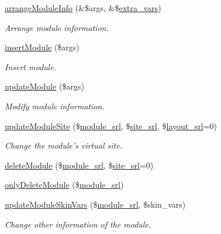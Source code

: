\begin{DoxyCompactItemize}
\hyperlink{classmoduleController_a4c5f4174ead13e475ea863184bf657d6}{arrange\+Module\+Info} (\&\$args, \&\$\hyperlink{ko_8install_8php_ae1dcb37fc34a8f312d2e6abd6f806743}{extra\+\_\+vars})
\begin{DoxyCompactList}\small\item\em Arrange module information. \end{DoxyCompactList}\item 
\hyperlink{classmoduleController_a8876924470cbfa94679d73dc6fc61332}{insert\+Module} (\$args)
\begin{DoxyCompactList}\small\item\em Insert module. \end{DoxyCompactList}\item 
\hyperlink{classmoduleController_ae4a1e785f41aa56a626b7f72346bbe0c}{update\+Module} (\$args)
\begin{DoxyCompactList}\small\item\em Modify module information. \end{DoxyCompactList}\item 
\hyperlink{classmoduleController_a9b1b3b8db4047c33882a9231c5eafb13}{update\+Module\+Site} (\$\hyperlink{ko_8install_8php_a370bb6450fab1da3e0ed9f484a38b761}{module\+\_\+srl}, \$\hyperlink{ko_8install_8php_a8b1406b4ad1048041558dce6bfe89004}{site\+\_\+srl}, \$\hyperlink{ko_8install_8php_a70054876db09b2519a1726663c8dd9e7}{layout\+\_\+srl}=0)
\begin{DoxyCompactList}\small\item\em Change the module's virtual site. \end{DoxyCompactList}\item 
\hyperlink{classmoduleController_add52eeb3f4a3cb900376af8007c09655}{delete\+Module} (\$\hyperlink{ko_8install_8php_a370bb6450fab1da3e0ed9f484a38b761}{module\+\_\+srl}, \$\hyperlink{ko_8install_8php_a8b1406b4ad1048041558dce6bfe89004}{site\+\_\+srl}=0)
\item 
\hyperlink{classmoduleController_ae34115eaf3d3b4d7621592f7cbfb9c7c}{only\+Delete\+Module} (\$\hyperlink{ko_8install_8php_a370bb6450fab1da3e0ed9f484a38b761}{module\+\_\+srl})
\item 
\hyperlink{classmoduleController_aa877238508d8cde2ad00f40b8ff283c0}{update\+Module\+Skin\+Vars} (\$\hyperlink{ko_8install_8php_a370bb6450fab1da3e0ed9f484a38b761}{module\+\_\+srl}, \$skin\+\_\+vars)
\begin{DoxyCompactList}\small\item\em Change other information of the module. \end{DoxyCompactList}\item 

\end{DoxyCompactItemize}
